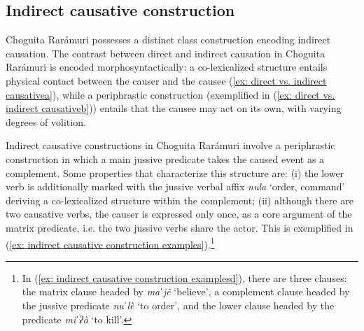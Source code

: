 \subsection{Indirect causative construction}
\label{subxsec: indirect causatives}

Choguita Rarámuri possesses a distinct class construction encoding indirect causation. The contrast between direct and indirect causation in Choguita Rarámuri is encoded morphosyntactically: a co-lexicalized structure entails physical contact between the causer and the causee (\ref{ex: direct vs. indirect causativea}), while a periphrastic construction (exemplified in (\ref{ex: direct vs. indirect causativeb})) entails that the causee may act on its own, with varying degrees of volition.

\ea\label{ex: direct vs. indirect causative}

    \label{ex: direct vs. indirect causativea}
        \label{ex: direct vs. indirect causativeb}
    \z
\z

Indirect causative constructions in Choguita Rarámuri involve a periphrastic construction in which a main jussive predicate takes the caused event as a complement. Some properties that characterize this structure are: (i) the lower verb is additionally marked with the jussive verbal affix \textit{nula} ‘order, command’ deriving a co-lexicalized structure within the complement; (ii) although there are two causative verbs, the causer is expressed only once, as a core argument of the matrix predicate, i.e. the two jussive verbs share the actor. This is exemplified in (\ref{ex: indirect causative construction examples}).\footnote{In (\ref{ex: indirect causative construction examplesd}), there are three clauses: the matrix clause headed by \textit{maˈjê} `believe', a complement clause headed by the jussive predicate \textit{nuˈlè} `to order', and the lower clause headed by the predicate \textit{miˈʔà} `to kill'.}

